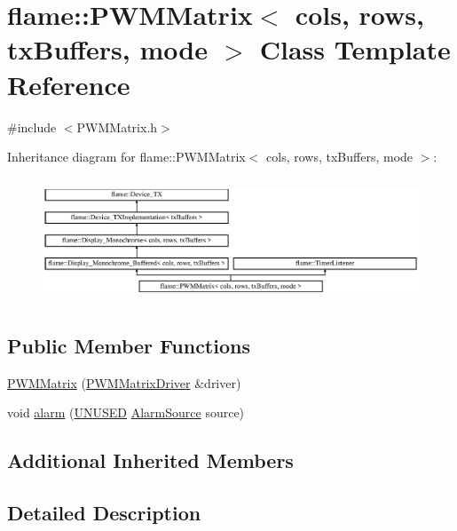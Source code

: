 \hypertarget{classflame_1_1_p_w_m_matrix}{\section{flame\-:\-:P\-W\-M\-Matrix$<$ cols, rows, tx\-Buffers, mode $>$ Class Template Reference}
\label{classflame_1_1_p_w_m_matrix}
}


{\ttfamily \#include $<$P\-W\-M\-Matrix.\-h$>$}

Inheritance diagram for flame\-:\-:P\-W\-M\-Matrix$<$ cols, rows, tx\-Buffers, mode $>$\-:\begin{figure}[H]
\begin{center}
\leavevmode
\includegraphics[height=3.713528cm]{classflame_1_1_p_w_m_matrix}
\end{center}
\end{figure}
\subsection*{Public Member Functions}
\begin{DoxyCompactItemize}
\item 
\hyperlink{classflame_1_1_p_w_m_matrix_aae241484775902899b2f27d68a4e0d92}{P\-W\-M\-Matrix} (\hyperlink{classflame_1_1_p_w_m_matrix_driver}{P\-W\-M\-Matrix\-Driver} \&driver)
\item 
void \hyperlink{classflame_1_1_p_w_m_matrix_a06ecc9848dee321f8b51994639f9fb56}{alarm} (\hyperlink{io_8h_addf5ec070e9499d36b7f2009ce736076}{U\-N\-U\-S\-E\-D} \hyperlink{namespaceflame_a6d176ba245556716fd3e32006bb7cfe5}{Alarm\-Source} source)
\end{DoxyCompactItemize}
\subsection*{Additional Inherited Members}


\subsection{Detailed Description}
